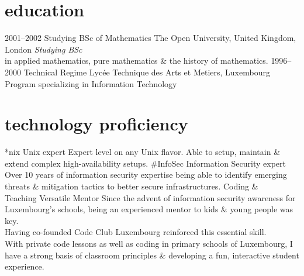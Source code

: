 \documentclass[]{friggeri-cv} %
\begin{document}
\newpage


\section{education}
\begin{entrylist}
\entry
{2001--2002}
{Studying BSc {\normalfont of Mathematics}}
{The Open University, United Kingdom, London}
{\emph{Studying BSc} \\ in applied mathematics, pure mathematics \& the history of mathematics.}
\entry
{1996--2000}
{Technical Regime}
{Lyc\'{e}e Technique des Arts et Metiers, Luxembourg}
{Program specializing in Information Technology}
\end{entrylist}


\section{technology proficiency}

\begin{entrylist}
\entry
{*nix}
{Unix expert}
{}
{Expert level on any Unix flavor. Able to setup, maintain \& extend complex high-availability setups.}
\entry
{\#InfoSec}
{Information Security expert}
{}
{Over 10 years of information security expertise being able to identify emerging threats \& mitigation tactics to better secure infrastructures.}
\entry
{Coding \& \\ Teaching}
{Versatile Mentor}
{}
{Since the advent of information security awareness for Luxembourg's schools, being an experienced mentor to kids \& young people was key. \\
Having co-founded Code Club Luxembourg reinforced this essential skill. \\
With private code lessons as well as coding in primary schools of Luxembourg, I have a strong basis of classroom principles \& developing a fun, interactive student experience.}
\end{entrylist}
\end{document}
